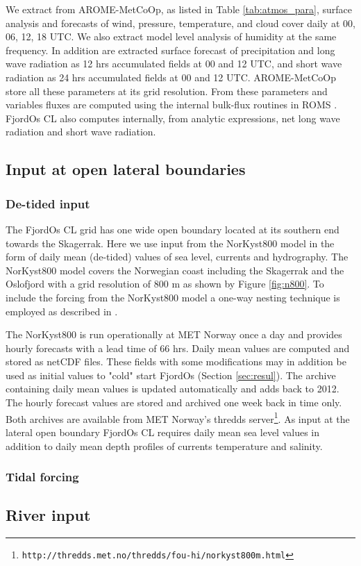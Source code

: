We extract from AROME-MetCoOp, as listed in Table \ref{tab:atmos_para}, surface analysis and forecasts of wind, pressure, temperature, and cloud cover daily at 00, 06, 12, 18 UTC. We also extract model level analysis of humidity at the same frequency. In addition are extracted surface forecast of precipitation and long wave radiation as 12 hrs accumulated fields at 00 and 12 UTC, and short wave radiation as 24 hrs accumulated fields at 00 and 12 UTC. AROME-MetCoOp store all these parameters at its grid resolution. From these parameters and variables fluxes are computed using the internal bulk-flux routines in ROMS \citep[e.g.,][]{roed:deber:2004}. FjordOs CL also computes internally, from analytic expressions, net long wave radiation and short wave radiation.


\subsection{Input at open lateral boundaries}
\label{subsec:lateral}

\subsubsection{De-tided input}
\label{subsubsec:detid}
The FjordOs CL grid has one wide open boundary located at its southern end towards the Skagerrak. Here we use input from the NorKyst800 model in the form of daily mean (de-tided) values of sea level, currents and hydrography. The NorKyst800 model covers the Norwegian coast including the Skagerrak and the Oslofjord with a grid resolution of 800 m as shown by Figure \ref{fig:n800}. To include the forcing from the NorKyst800 model a one-way nesting technique is employed as described in \cite{march:etal:2001}.  

The NorKyst800 is run operationally at MET Norway once a day and provides hourly forecasts with a lead time of 66 hrs. Daily mean values are computed and stored as netCDF files. These fields with some modifications may in addition be used as initial values to "cold" start FjordOs (Section \ref{sec:resul}). The archive containing daily mean values is updated automatically and adds back to 2012. The hourly forecast values are stored and archived one week back in time only. Both archives are available from MET Norway's thredds server\footnote{\texttt{http://thredds.met.no/thredds/fou-hi/norkyst800m.html}}. As input at the lateral open boundary FjordOs CL requires daily mean sea level values in addition to daily mean depth profiles of currents temperature and salinity.

\clearpage
\subsubsection{Tidal forcing}
\label{subsubsec:tides}


\subsection{River input}
\label{subsec:river}


